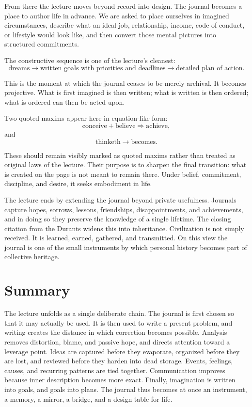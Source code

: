 From there the lecture moves beyond record into design. The journal becomes a place to author life in advance. We are asked to place ourselves in imagined circumstances, describe what an ideal job, relationship, income, code of conduct, or lifestyle would look like, and then convert those mental pictures into structured commitments.

The constructive sequence is one of the lecture's cleanest:
\begin{equation}
\text{dreams}\rightarrow \text{written goals with priorities and deadlines}\rightarrow \text{detailed plan of action}.
\end{equation}

This is the moment at which the journal ceases to be merely archival. It becomes projective. What is first imagined is then written; what is written is then ordered; what is ordered can then be acted upon.

Two quoted maxims appear here in equation-like form:
\begin{equation}
\text{conceive}+\text{believe}\Rightarrow \text{achieve},
\end{equation}
and
\begin{equation}
\text{thinketh}\rightarrow \text{becomes}.
\end{equation}

These should remain visibly marked as quoted maxims rather than treated as original laws of the lecture. Their purpose is to sharpen the final transition: what is created on the page is not meant to remain there. Under belief, commitment, discipline, and desire, it seeks embodiment in life.

The lecture ends by extending the journal beyond private usefulness. Journals capture hopes, sorrows, lessons, friendships, disappointments, and achievements, and in doing so they preserve the knowledge of a single lifetime. The closing citation from the Durants widens this into inheritance. Civilization is not simply received. It is learned, earned, gathered, and transmitted. On this view the journal is one of the small instruments by which personal history becomes part of collective heritage.

\section{Summary}

The lecture unfolds as a single deliberate chain. The journal is first chosen so that it may actually be used. It is then used to write a present problem, and writing creates the distance in which correction becomes possible. Analysis removes distortion, blame, and passive hope, and directs attention toward a leverage point. Ideas are captured before they evaporate, organized before they are lost, and reviewed before they harden into dead storage. Events, feelings, causes, and recurring patterns are tied together. Communication improves because inner description becomes more exact. Finally, imagination is written into goals, and goals into plans. The journal thus becomes at once an instrument, a memory, a mirror, a bridge, and a design table for life.